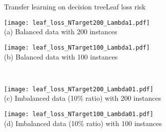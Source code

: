 \begin{frame}{Transfer learning on decision tree}{Leaf loss risk}
\renewcommand{\ratio}{0.78}
\renewcommand{\ratiob}{0.45}
    \centering
    \begin{minipage}[t]{0.8\linewidth}\vspace{0pt}
        \centering
        \begin{minipage}[t]{\ratiob\linewidth}\vspace{0pt}
            \centering
            \texttt{[image: leaf\_loss\_NTarget200\_Lambda1.pdf]}\\
            {\small(a)\; Balanced data with 200 instances}
        \end{minipage}\vspace{0.2cm}
        \begin{minipage}[t]{\ratiob\linewidth}\vspace{0pt}
            \centering
            \texttt{[image: leaf\_loss\_NTarget100\_Lambda1.pdf]}\\
            {\small(b)\; Balanced data with 100 instances }
        \end{minipage}
        \\
        \begin{minipage}[t]{\ratiob\linewidth}\vspace{0pt}
            \centering
            \texttt{[image: leaf\_loss\_NTarget200\_Lambda01.pdf]}\\
            {\small (c)\; Imbalanced data (10\% ratio) with 200 instances}
        \end{minipage}
        \centering
        \begin{minipage}[t]{\ratiob\linewidth}\vspace{0pt}
            \centering
            \texttt{[image: leaf\_loss\_NTarget100\_Lambda01.pdf]}\\
            {\small (d)\; Imbalanced data (10\% ratio) with 100 instances}
        \end{minipage}\vspace{0.1cm}
    \end{minipage}

\end{frame}

